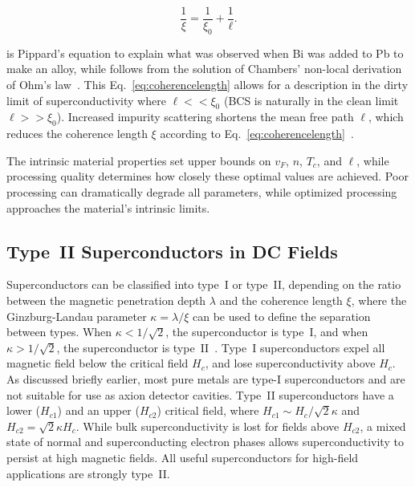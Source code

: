     \begin{equation}
        \frac{1}{\xi} = \frac{1}{\xi_0} + \frac{1}{\ell} .\label{eq:coherencelength}
    \end{equation} 
    
    \noindent is Pippard's equation to explain what was observed when Bi was added to Pb to make an alloy, while follows from the solution of Chambers' non-local derivation of Ohm's law~\cite{chambersAnomalousSkinEffect1952}. This Eq.~\ref{eq:coherencelength} allows for a description in the dirty limit of superconductivity where $\ell << \xi_0$ (BCS is naturally in the clean limit $\ell >> \xi_0$). Increased impurity scattering shortens the mean free path $\ell$, which reduces the coherence length $\xi$ according to Eq.~\ref{eq:coherencelength}~\cite{tinkhamIntroductionSuperconductivity2004}. 
    

    The intrinsic material properties set upper bounds on $v_F$, $n$, $T_c$, and $\ell$, while processing quality determines how closely these optimal values are achieved. Poor processing can dramatically degrade all parameters, while optimized processing approaches the material's intrinsic limits.

    \subsection{Type~II Superconductors in DC Fields}

    Superconductors can be classified into type~I or type~II, depending on the ratio between the magnetic penetration depth $\lambda$ and the coherence length $\xi$, where the Ginzburg-Landau parameter $\kappa = \lambda / \xi$ can be used to define the separation between types. When $\kappa < 1/\sqrt{2}$, the superconductor is type~I, and when $\kappa > 1/\sqrt{2}$, the superconductor is type~II~\cite{tinkhamIntroductionSuperconductivity2004}. Type~I superconductors expel all magnetic field below the critical field $H_c$, and lose superconductivity above $H_c$. As discussed briefly earlier, most pure metals are type-I superconductors and are not suitable for use as axion detector cavities. Type~II superconductors have a lower ($H_{c1}$) and an upper ($H_{c2}$) critical field, where $H_{c1} \sim H_c/ \sqrt{2} \kappa$ and $H_{c2} = \sqrt{2} \kappa H_c$. While bulk superconductivity is lost for fields above $H_{c2}$, a mixed state of normal and superconducting electron phases allows superconductivity to persist at high magnetic fields. All useful superconductors for high-field applications are strongly type~II.
    
